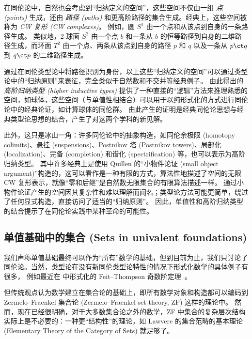 在同伦论中，自然也会考虑到“归纳定义的空间”，这些空间不仅由一组 \emph{点 (points)} 生成，还由 \emph{路径 (paths)} 和更高阶路径的集合生成。经典上，这些空间被称为 \emph{CW 复形 (CW complexes)}。
例如，圆 $S^1$ 由一个点和从该点到自身的一条路径生成。
类似地，2-球面 $S^2$ 由一个点 $b$ 和一条从 $b$ 的恒等路径到自身的二维路径生成，而环面 $T^2$ 由一个点、两条从该点到自身的路径 $p$ 和 $q$ 以及一条从 $p\ct q$ 到 $q\ct p$ 的二维路径生成。

通过在同伦类型论中将路径识别为身份，以上这些“归纳定义的空间”可以通过类型论中的“归纳原则”来表征，完全类似于自然数和不交并等经典例子。
由此得出的 \emph{高阶归纳类型 (higher inductive types)}
提供了一种直接的“逻辑”方法来推理熟悉的空间，如球体，这些空间（与单值性相结合）可以用于以纯形式化的方式进行同伦论中的经典论证，如计算球体的同伦群。
由此产生的证明是经典同伦论思想与经典类型论思想的结合，产生了对这两个学科的新见解。

此外，这只是冰山一角：许多同伦论中的抽象构造，如同伦余极限 (homotopy colimits)、悬挂 (suspensions)、Postnikov 塔 (Postnikov towers)、局部化 (localization)、完备 (completion) 和谱化 (spectrification) 等，也可以表示为高阶归纳类型。
其中许多经典上是使用 Quillen 的“小物件论证 (small object argument)”构造的，这可以看作是一种有限的方式，算法性地描述了空间的无限 CW 复形表示，就像“零和后继”是自然数无限集合的有限算法描述一样。
通过小物件论证产生的空间因其复杂性和难以理解而闻名；类型论方法可能更简单，绕过了任何显式构造，直接访问了适当的“归纳原则”。
因此，单值性和高阶归纳类型的结合提示了在同伦论实践中某种革命的可能性。

\subsection*{单值基础中的集合 (Sets in univalent foundations)}

%

我们声称单值基础最终可以作为“所有”数学的基础，但到目前为止，我们只讨论了同伦论。当然，类型论在没有新同伦类型论特性的情况下形式化数学的具体例子有很多，
例如最近在 \Coq 中形式化的 Feit--Thompson 奇数阶定理~\cite{gonthier}。

但传统观点认为数学建立在集合论的基础上，即所有数学对象和构造都可以编码到 Zermelo--Fraenkel 集合论 (Zermelo--Fraenkel set theory, ZF) 这样的理论中。
然而，现在已经很明确，对于大多数集合论之外的数学，ZF 中集合的复杂层次结构实际上是不必要的：一种更“结构性”的理论，如 Lawvere 的集合范畴的基本理论 (Elementary Theory of the Category of Sets) 就足够了。
%

